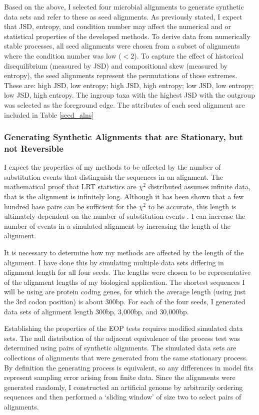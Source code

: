 Based on the above, I selected four microbial alignments to generate synthetic data sets and refer to these as seed alignments. As previously stated, I expect that JSD, entropy, and condition number may affect the numerical and or statistical properties of the developed methods. To derive data from numerically stable processes, all seed alignments were chosen from a subset of alignments where the condition number was low ($<2$). To capture the effect of historical disequilibrium (measured by JSD) and compositional skew (measured by entropy), the seed alignments represent the permutations of those extremes. These are: high JSD, low entropy; high JSD, high entropy; low JSD, low entropy; low JSD, high entropy. The ingroup taxa with the highest JSD with the outgroup was selected as the foreground edge. The attributes of each seed alignment are included in Table \ref{seed_alns} 



\subsubsection{Generating Synthetic Alignments that are Stationary, but not Reversible}
I expect the properties of my methods to be affected by the number of substitution events that distinguish the sequences in an alignment. The mathematical proof that LRT statistics are $\chi^{2}$ distributed assumes infinite data, that is the alignment is infinitely long. Although it has been shown that a few hundred base pairs can be sufficient for the $\chi^{2}$ to be accurate, this length is ultimately dependent on the number of substitution events \citep{Ota2000AppropriateParameters}. I can increase the number of events in a simulated alignment by increasing the length of the alignment.

It is necessary to determine how my methods are affected by the length of the alignment. I have done this by simulating multiple data sets differing in alignment length for all four seeds. The lengths were chosen to be representative of the alignment lengths of my biological application. The shortest sequences I will be using are protein coding genes, for which the average length (using just the 3rd codon position) is about 300bp. For each of the four seeds, I generated data sets of alignment length 300bp, 3,000bp, and 30,000bp.   

Establishing the properties of the EOP tests requires modified simulated data sets. The null distribution of the adjacent equivalence of the process test was determined using pairs of synthetic alignments. The simulated data sets are collections of alignments that were generated from the same stationary process. By definition the generating process is equivalent, so any differences in model fits represent sampling error arising from finite data. Since the alignments were generated randomly, I constructed an artificial genome by arbitrarily ordering sequences and then performed a `sliding window' of size two to select pairs of alignments.

